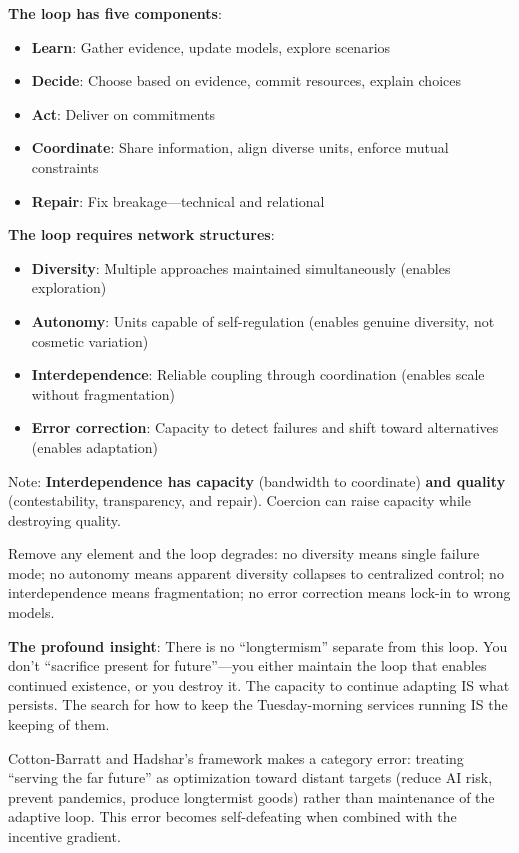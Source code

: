 \documentclass[12pt,a4paper]{article}
\begin{document}
\textbf{The loop has five components}:
\begin{itemize}
\item \textbf{Learn}: Gather evidence, update models, explore scenarios
\item \textbf{Decide}: Choose based on evidence, commit resources, explain choices
\item \textbf{Act}: Deliver on commitments
\item \textbf{Coordinate}: Share information, align diverse units, enforce mutual constraints
\item \textbf{Repair}: Fix breakage---technical and relational
\end{itemize}

\textbf{The loop requires network structures}:
\begin{itemize}
\item \textbf{Diversity}: Multiple approaches maintained simultaneously (enables exploration)
\item \textbf{Autonomy}: Units capable of self-regulation (enables genuine diversity, not cosmetic variation)
\item \textbf{Interdependence}: Reliable coupling through coordination (enables scale without fragmentation)
\item \textbf{Error correction}: Capacity to detect failures and shift toward alternatives (enables adaptation)
\end{itemize}

Note: \textbf{Interdependence has capacity} (bandwidth to coordinate) \textbf{and quality} (contestability, transparency, and repair). Coercion can raise capacity while destroying quality.

Remove any element and the loop degrades: no diversity means single failure mode; no autonomy means apparent diversity collapses to centralized control; no interdependence means fragmentation; no error correction means lock-in to wrong models.

\textbf{The profound insight}: There is no ``longtermism'' separate from this loop. You don't ``sacrifice present for future''---you either maintain the loop that enables continued existence, or you destroy it. The capacity to continue adapting IS what persists. The search for how to keep the Tuesday-morning services running IS the keeping of them.

Cotton-Barratt and Hadshar's framework makes a category error: treating ``serving the far future'' as optimization toward distant targets (reduce AI risk, prevent pandemics, produce longtermist goods) rather than maintenance of the adaptive loop. This error becomes self-defeating when combined with the incentive gradient.
\end{document}
